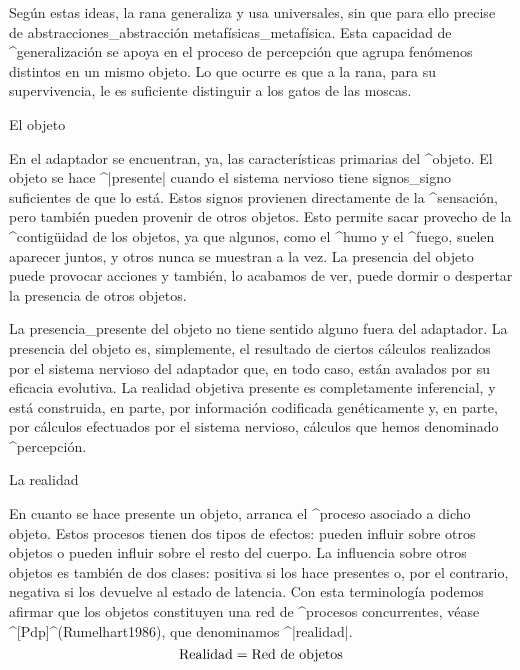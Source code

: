 Según estas ideas, la rana generaliza y usa universales, sin que para
ello precise de abstracciones_{abstracción} metafísicas_{metafísica}.
Esta capacidad de ^{generalización} se apoya en el proceso de percepción
que agrupa fenómenos distintos en un mismo objeto. Lo que ocurre es que
a la rana, para su supervivencia, le es suficiente distinguir a los
gatos de las moscas.


\Section El objeto

En el adaptador se encuentran, ya, las características primarias del
^{objeto}. El objeto se hace ^|presente| cuando el sistema nervioso
tiene signos_{signo} suficientes de que lo está. Estos signos provienen
directamente de la ^{sensación}, pero también pueden provenir de otros
objetos. Esto permite sacar provecho de la ^{contigüidad} de los
objetos, ya que algunos, como el ^{humo} y el ^{fuego}, suelen aparecer
juntos, y otros nunca se muestran a la vez. La presencia del objeto
puede provocar acciones y también, lo acabamos de ver, puede dormir o
despertar la presencia de otros objetos.

La presencia_{presente} del objeto no tiene sentido alguno fuera del
adaptador. La presencia del objeto es, simplemente, el resultado de
ciertos cálculos realizados por el sistema nervioso del adaptador que,
en todo caso, están avalados por su eficacia evolutiva. La realidad
objetiva presente es completamente inferencial, y está construida, en
parte, por información codificada genéticamente y, en parte, por
cálculos efectuados por el sistema nervioso, cálculos que hemos
denominado ^{percepción}.


\Section La realidad

En cuanto se hace presente un objeto, arranca el ^{proceso} asociado a
dicho objeto. Estos procesos tienen dos tipos de efectos: pueden influir
sobre otros objetos o pueden influir sobre el resto del cuerpo. La
influencia sobre otros objetos es también de dos clases: positiva si los
hace presentes o, por el contrario, negativa si los devuelve al estado
de latencia. Con esta terminología podemos afirmar que los objetos
constituyen una red de ^{procesos concurrentes}, véase
^[Pdp]^(Rumelhart1986), que denominamos ^|realidad|.
$$\hbox{Realidad} = \hbox{Red de objetos}$$

